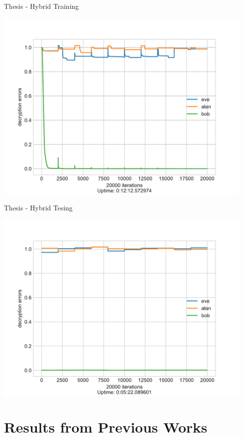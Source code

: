 \documentclass[a4paper, 12pt]{report}
\begin{document}
\begin{blockfigure}{Thesis - Hybrid Training}
	\begin{center}
		\includegraphics[width = 0.95\textwidth]{neurencoder-hybrid-training}
	\end{center}
\end{blockfigure}
\begin{blockfigure}{Thesis - Hybrid Tesing}
	\begin{center}
		\includegraphics[width = 0.95\textwidth]{neurencoder-hybrid-testing}
	\end{center}
\end{blockfigure}
\newpage
\section{\textbf{Results from Previous Works}}
\end{document}
